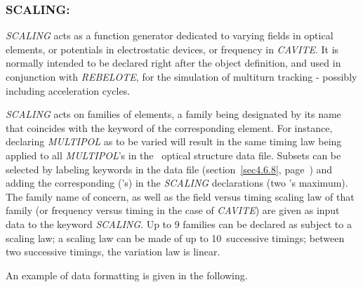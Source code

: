\subsubsection*{SCALING: \SCALINGTitl} \label{SCALING}  

\textsl{SCALING} acts as a function generator dedicated to varying 
fields in optical elements, or potentials in 
electrostatic devices, or  frequency in \textsl{CAVITE}. It is normally intended
to be declared right after the object definition, and used in conjunction 
with \textsl{REBELOTE}, for the simulation of multiturn tracking - possibly including  acceleration
 cycles.  

\bigskip

\noindent\textsl{SCALING} acts on families of elements,  a family being
designated by its name that  coincides with 
the keyword of the corresponding element. For instance, declaring \textsl{MULTIPOL} 
as to be varied will result in the same timing law being applied to all 
\textsl{MULTIPOL}'s in the \zgou\ optical structure data file. Subsets can be selected by 
labeling keywords in the data file (section~\ref{sec4.6.8}, page~\pageref{sec4.6.8}) 
and adding the corresponding \LABEL('s) 
in the \textsl{SCALING} declarations (two \LABEL's maximum). The family name of concern, 
as well as the field versus timing scaling law of that 
family (or frequency versus timing in the case of \textsl{CAVITE}) are given as
input data to the keyword \textsl{SCALING}. Up to 9 families can be declared
as subject to a scaling law; a scaling law can be made of up to 10~successive timings; 
between two successive timings, the variation law is linear.  
\bigskip

\noindent An example of data formatting is given in the following. 

\bigskip

